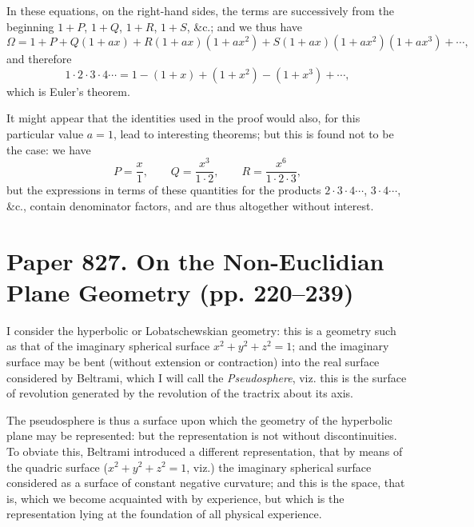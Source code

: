 \documentclass[11pt,a4paper]{book}
\begin{document}
In these equations, on the right-hand sides, the terms are successively from the beginning $1+P$, $1+Q$, $1+R$, $1+S$, \&c.; and we thus have
\[
\Omega = 1 + P + Q(1+ax) + R(1+ax)(1+ax^2) + S(1+ax)(1+ax^2)(1+ax^3) + \cdots,
\]
and therefore
\[
1 \cdot 2 \cdot 3 \cdot 4 \cdots = 1 - (1+x) + (1+x^2) - (1+x^3) + \cdots,
\]
which is Euler's theorem.

It might appear that the identities used in the proof would also, for this particular value $a=1$, lead to interesting theorems; but this is found not to be the case: we have
\[
P = \frac{x}{1}, \qquad Q = \frac{x^3}{1\cdot 2}, \qquad R = \frac{x^6}{1\cdot 2\cdot 3},
\]
but the expressions in terms of these quantities for the products $2\cdot 3\cdot 4\cdots$, $3\cdot 4\cdots$, \&c., contain denominator factors, and are thus altogether without interest.

\newpage
\section{Paper 827. On the Non-Euclidian Plane Geometry (pp. 220--239)}


\begin{art}
I consider the hyperbolic or Lobatschewskian geometry: this is a geometry such as that of the imaginary spherical surface $x^2 + y^2 + z^2 = 1$; and the imaginary surface may be bent (without extension or contraction) into the real surface considered by Beltrami, which I will call the \textit{Pseudosphere}, viz. this is the surface of revolution generated by the revolution of the tractrix about its axis.
\end{art}

\begin{art}
The pseudosphere is thus a surface upon which the geometry of the hyperbolic plane may be represented: but the representation is not without discontinuities. To obviate this, Beltrami introduced a different representation, that by means of the quadric surface ($x^2+y^2+z^2=1$, viz.) the imaginary spherical surface considered as a surface of constant negative curvature; and this is the space, that is, which we become acquainted with by experience, but which is the representation lying at the foundation of all physical experience.
\end{art}
\end{document}
